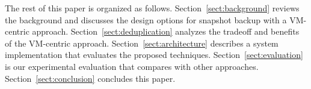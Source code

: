 

The rest of this paper is organized as follows.
Section~\ref{sect:background} reviews the background and discusses the  design options for snapshot backup 
with a VM-centric approach. 
Section~\ref{sect:deduplication}  analyzes the tradeoff and benefits of the VM-centric approach. 
Section~\ref{sect:architecture}  describes a system implementation that evaluates the proposed techniques.
Section~\ref{sect:evaluation} is our experimental evaluation that compares with other approaches.
Section~\ref{sect:conclusion}  concludes this paper.
